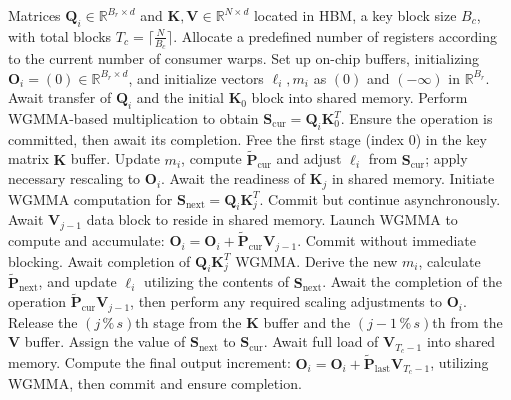 \begin{algorithm}[H]
    \caption{\small\label{alg:flash3_wgmma}\textsc{FlashAttention-3} consumer warpgroup forward pass}
    \begin{algorithmic}[1]
      \REQUIRE  Matrices $\mathbf{Q}_i \in \mathbb{R}^{B_r \times d}$ and $\mathbf{K}, \mathbf{V} \in \mathbb{R}^{N \times d}$ located in HBM, a key block size $B_c$, with total blocks $T_c = \lceil \frac{N}{B_c} \rceil$.
      \STATE Allocate a predefined number of registers according to the current number of consumer warps.
      \STATE Set up on-chip buffers, initializing $\mathbf{O}_i = (0) \in \mathbb{R}^{B_r \times d}$, and initialize vectors $\ell_i, m_i$ as $(0)$ and $(-\infty)$ in $\mathbb{R}^{B_r}$.
      \STATE Await transfer of $\mathbf{Q}_i$ and the initial $\mathbf{K}_0$ block into shared memory.
      \STATE Perform WGMMA-based multiplication to obtain $\mathbf{S}_{\mathrm{cur}} = \mathbf{Q}_i \mathbf{K}_0^T$. Ensure the operation is committed, then await its completion.
      \STATE Free the first stage (index $0$) in the key matrix $\mathbf{K}$ buffer.
      \STATE Update $m_{i}$, compute $\tilde{\mathbf{P}}_{\mathrm{cur}}$ and adjust $\ell_{i}$ from $\mathbf{S}_{\mathrm{cur}}$; apply necessary rescaling to $\mathbf{O}_i$.
        \STATE Await the readiness of $\mathbf{K}_j$ in shared memory.
        \label{code:mainloop_start}
        \STATE Initiate WGMMA computation for $\mathbf{S}_{\mathrm{next}} = \mathbf{Q}_i \mathbf{K}_{j}^T$. Commit but continue asynchronously. \label{code:first_wgmma}
        \STATE Await $\mathbf{V}_{j-1}$ data block to reside in shared memory.
        \STATE Launch WGMMA to compute and accumulate: $\mathbf{O}_{i} = \mathbf{O}_{i} + \tilde{\mathbf{P}}_{\mathrm{cur}} \mathbf{V}_{j-1}$. Commit without immediate blocking. \label{code:second_wgmma}
        \STATE Await completion of $\mathbf{Q}_i \mathbf{K}_{j}^T$ WGMMA.
        \STATE Derive the new $m_{i}$, calculate $\tilde{\mathbf{P}}_{\mathrm{next}}$, and update $\ell_{i}$ utilizing the contents of $\mathbf{S}_{\mathrm{next}}$. \label{code:softmax}
        \STATE Await the completion of the operation $\tilde{\mathbf{P}}_{\mathrm{cur}} \mathbf{V}_{j-1}$, then perform any required scaling adjustments to $\mathbf{O}_i$.
        \STATE Release the $(j\,\%\,s)$th stage from the $\mathbf{K}$ buffer and the $(j-1\,\%\,s)$th from the $\mathbf{V}$ buffer.
        \STATE Assign the value of $\mathbf{S}_{\mathrm{next}}$ to $\mathbf{S}_{\mathrm{cur}}$.
        \label{code:mainloop_end}
      \ENDFOR \STATE Await full load of $\mathbf{V}_{T_c - 1}$ into shared memory.
      \STATE Compute the final output increment:
      $\mathbf{O}_{i} = \mathbf{O}_{i} + \tilde{\mathbf{P}}_{\mathrm{last}} \mathbf{V}_{T_c - 1}$, utilizing WGMMA, then commit and ensure completion.


\end{algorithmic}
\end{algorithm}

